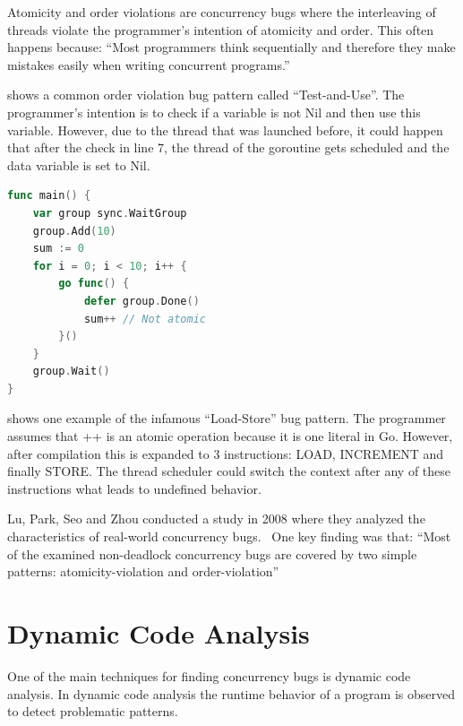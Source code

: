 \documentclass[conference]{IEEEtran}
\begin{document}
Atomicity and order violations are concurrency bugs where the interleaving of threads violate the programmer's intention of atomicity and order.
This often happens because:
``Most programmers think sequentially and therefore they make mistakes easily when writing concurrent programs.''~\cite{lu2008mistakes}

 shows a common order violation bug pattern called ``Test-and-Use''.
The programmer's intention is to check if a variable is not Nil and then use this variable.
However, due to the thread that was launched before, it could happen that after the check in line 7, the thread of the goroutine gets scheduled and the data variable is set to Nil.

\begin{lstlisting}[float=h, language=Go, label=lst:atomicity, caption=Load-Store bug pattern -- Atomicity violation]
func main() {
    var group sync.WaitGroup
    group.Add(10)
    sum := 0
    for i = 0; i < 10; i++ {
        go func() {
            defer group.Done()
            sum++ // Not atomic
        }()
    }
    group.Wait()
}
\end{lstlisting}

 shows one example of the infamous ``Load-Store'' bug pattern.
The programmer assumes that ++ is an atomic operation because it is one literal in Go.
However, after compilation this is expanded to 3 instructions: LOAD, INCREMENT and finally STORE.
The thread scheduler could switch the context after any of these instructions what leads to undefined behavior.

Lu, Park, Seo and Zhou conducted a study in 2008 where they analyzed the characteristics of real-world concurrency bugs.~\cite{lu2008mistakes}
One key finding was that:
``Most of the examined non-deadlock concurrency bugs are covered by two simple patterns: atomicity-violation and order-violation''~\cite{lu2008mistakes}


\section{Dynamic Code Analysis}
\label{sct:dynamic}

One of the main techniques for finding concurrency bugs is dynamic code analysis.
In dynamic code analysis the runtime behavior of a program is observed to detect problematic patterns.
\end{document}
